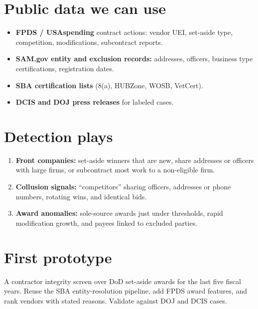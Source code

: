 \documentclass[letterpaper,11pt]{article}
\providecommand{\tightlist}{\setlength{\itemsep}{0pt}\setlength{\parskip}{0pt}}
\begin{document}
\hypertarget{public-data-we-can-use}{%
\section{Public data we can use}\label{public-data-we-can-use}}

\begin{itemize}
\tightlist
\item
  \textbf{FPDS / USAspending} contract actions: vendor UEI, set-aside
  type, competition, modifications, subcontract reports.
\item
  \textbf{SAM.gov entity and exclusion records:} addresses, officers,
  business type certifications, registration dates.
\item
  \textbf{SBA certification lists} (8(a), HUBZone, WOSB, VetCert).
\item
  \textbf{DCIS and DOJ press releases} for labeled cases.
\end{itemize}

\hypertarget{detection-plays}{%
\section{Detection plays}\label{detection-plays}}

\begin{enumerate}
\def\labelenumi{\arabic{enumi}.}
\tightlist
\item
  \textbf{Front companies:} set-aside winners that are new, share
  addresses or officers with large firms, or subcontract most work to a
  non-eligible firm.
\item
  \textbf{Collusion signals:} ``competitors'' sharing officers,
  addresses or phone numbers, rotating wins, and identical bids.
\item
  \textbf{Award anomalies:} sole-source awards just under thresholds,
  rapid modification growth, and payees linked to excluded parties.
\end{enumerate}

\hypertarget{first-prototype}{%
\section{First prototype}\label{first-prototype}}

A contractor integrity screen over DoD set-aside awards for the last
five fiscal years. Reuse the SBA entity-resolution pipeline, add FPDS
award features, and rank vendors with stated reasons. Validate against
DOJ and DCIS cases.
\end{document}
